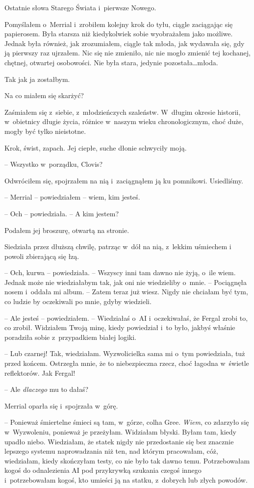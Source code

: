 \documentclass[oneside,polish,11pt,sfheadings]{mwbk}
\begin{document}
Ostatnie słowa Starego Świata i~pierwsze Nowego.

Pomyślałem o~Merrial i~zrobiłem kolejny krok do tyłu, ciągle zaciągając
się papierosem. Była starsza niż kiedykolwiek sobie wyobrażałem jako
możliwe. Jednak była również, jak zrozumiałem, ciągle tak młoda, jak
wydawała się, gdy ją pierwszy raz ujrzałem. Nic się nie zmieniło, nic
nie mogło zmienić tej kochanej, chętnej, otwartej osobowości. Nie była
stara, jedynie pozostała\ldots młoda.

Tak jak ja zostałbym.

Na co miałem się skarżyć?

Zaśmiałem się z~siebie, z~młodzieńczych szaleństw. W~długim okresie
historii, w~obietnicy długie życia, różnice w~naszym wieku
chronologicznym, choć duże, mogły być tylko nieistotne.

Krok, świst, zapach. Jej ciepłe, suche dłonie schwyciły moją.

-- Wszystko w~porządku, Clovis?

Odwróciłem się, spojrzałem na nią i~zaciągnąłem ją ku pomnikowi.
Usiedliśmy.

-- Merrial -- powiedziałem -- wiem, kim jesteś.

-- Och -- powiedziała. -- A kim jestem?

Podałem jej broszurę, otwartą na stronie.

Siedziała przez dłuższą chwilę, patrząc w~dół na nią, z~lekkim uśmiechem
i powoli zbierającą się łzą.

-- Och, kurwa -- powiedziała. -- Wszyscy inni tam dawno nie żyją, o~ile
wiem. Jednak może nie wiedziałabym tak, jak oni nie wiedzieliby o~mnie.
-- Pociągnęła nosem i~oddała mi album. -- Zatem teraz już wiesz. Nigdy nie
chciałam być tym, co ludzie by oczekiwali po mnie, gdyby wiedzieli.

-- Ale jesteś -- powiedziałem. -- Wiedziałaś o~AI i~oczekiwałaś, że Fergal
zrobi to, co zrobił. Widziałem Twoją minę, kiedy powiedział i~to było,
jakbyś właśnie poradziła sobie z~przypadkiem białej logiki.

-- Lub czarnej! Tak, wiedziałam. Wyzwolicielka sama mi o~tym powiedziała,
tuż przed końcem. Ostrzegła mnie, że to niebezpieczna rzecz, choć
łagodna w~świetle reflektorów. Jak Fergal!

-- Ale \textit{dlaczego} mu to dałaś?

Merrial oparła się i~spojrzała w~górę. 

-- Ponieważ śmiertelne śmieci są
tam, w~górze, colha Gree. \textit{Wiem}, co zdarzyło się w~Wyzwoleniu,
ponieważ je przeżyłam. Widziałam błyski. Byłam tam, kiedy upadło niebo.
Wiedziałam, że statek nigdy nie przedostanie się bez znacznie lepszego
systemu naprowadzania niż ten, nad którym pracowałam, cóż, wiedziałam,
kiedy skończyłam testy, co nie było tak dawno temu. Potrzebowałam kogoś
do odnalezienia AI pod przykrywką szukania czegoś innego i~potrzebowałam
kogoś, kto umieści ją na statku, z~dobrych lub złych powodów.
\end{document}
